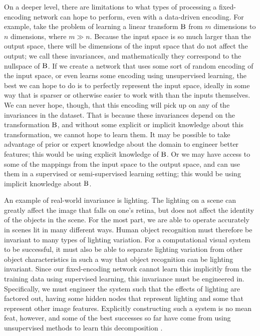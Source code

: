 On a deeper level,
there are limitations to what types of processing a fixed-encoding network
can hope to perform,
even with a data-driven encoding.
For example, take the problem of learning a linear transform $\mathrm{B}$
from $m$ dimensions to $n$ dimensions, where $m \gg n$.
Because the input space is so much larger than the output space,
there will be dimensions of the input space that do not affect the output;
we call these invariances,
and mathematically they correspond to the nullspace of $\mathrm{B}$.
If we create a network that uses some sort of random encoding of the input space,
or even learns some encoding using unsupervised learning,
the best we can hope to do is to perfectly represent the input space,
ideally in some way that is sparser or otherwise easier to work with
than the inputs themselves.
We can never hope, though,
that this encoding will pick up on any of the invariances in the dataset.
That is because these invariances depend on the transformation $\mathrm{B}$,
and without some explicit or implicit knowledge about this transformation,
we cannot hope to learn them.
It may be possible to take advantage of prior or expert knowledge
about the domain to engineer better features;
this would be using explicit knowledge of $\mathrm{B}$.
Or we may have access to some of the mappings
from the input space to the output space,
and can use them in a supervised or semi-supervised learning setting;
this would be using implicit knowledge about $\mathrm{B}$.

An example of real-world invariance is lighting.
The lighting on a scene can greatly affect the image that falls on one's retina,
but does not affect the identity of the objects in the scene.
For the most part, we are able to operate accurately in scenes lit in many different ways.
Human object recognition must therefore be invariant to many types of lighting variation.
For a computational visual system to be successful,
it must also be able to separate lighting variation from other object characteristics
in such a way that object recognition can be lighting invariant.
Since our fixed-encoding network cannot learn this implicitly
from the training data using supervised learning,
this invariance must be engineered in.
Specifically, we must engineer the system
such that the effects of lighting are factored out,
having some hidden nodes that represent lighting
and some that represent other image features.
Explicitly constructing such a system is no mean feat, however,
and some of the best successes so far have come from using
unsupervised methods to learn this decomposition \parencite{Tang2012}.

